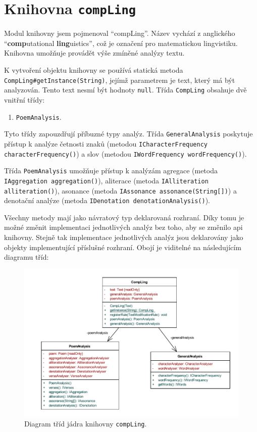 \documentclass[dp.tex]{subfiles}
\begin{document}
\section{Knihovna \texttt{compLing}}

Modul knihovny jsem pojmenoval \enquote{compLing}. Název vychází z anglického \enquote{\textbf{comp}utational \textbf{ling}uistics}, což je označení pro matematickou lingvistiku. Knihovna umožňuje provádět výše zmíněné analýzy textu. 

\sloppy
K vytvoření objektu knihovny se používá statická metoda \texttt{ CompLing\#getInstance(String)}, jejímž parametrem je text, který má být analyzován. Tento text nesmí být hodnoty \texttt{null}. Třída \texttt{CompLing} obsahuje dvě vnitřní třídy:
\begin{enumerate}
	\item \texttt{PoemAnalysis}.
\end{enumerate}

Tyto třídy zapouzdřují příbuzné typy analýz. Třída \texttt{GeneralAnalysis} poskytuje přístup k analýze četnosti znaků (metodou \texttt{ICharacterFrequency characterFrequency()}) a slov (metodou \texttt{IWordFrequency wordFrequency()}). 

\sloppy
Třída \texttt{PoemAnalysis} umožňuje přístup k analýzám agregace (metoda \texttt{IAggregation aggregation()}), aliterace (metoda \texttt{IAlliteration alliteration()}), asonance (metoda \texttt{IAssonance assonance(String[])}) a denotační analýze (metoda \texttt{IDenotation denotationAnalysis()}).

Všechny metody mají jako návratový typ deklarovaná rozhraní. Díky tomu je možné změnit implementaci jednotlivých analýz bez toho, aby se změnilo \acrshort{api} knihovny. Stejně tak implementace jednotlivých analýz jsou deklarovány jako objekty implementující příslušné rozhraní. Obojí je viditelné na následujícím diagramu tříd:

\begin{figure}[h!]
	\centering
	\includegraphics[max width=\textwidth,keepaspectratio=true]{imgs-60-aplikace/compLing-class-diagram.pdf}
	\caption{Diagram tříd jádra knihovny \texttt{compLing}.}
	\label{fig:compling-core-class}
\end{figure}
\end{document}
